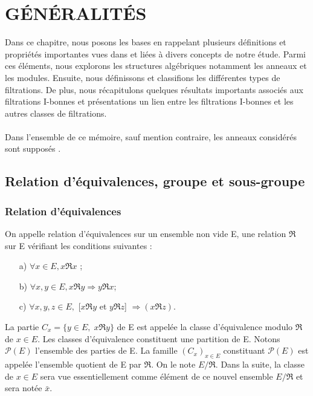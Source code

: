 \chapter{GÉNÉRALITÉS}
Dans ce chapitre, nous posons les bases en rappelant plusieurs définitions et propriétés importantes vues dans \cite{Di2} et liées à divers concepts de notre étude. Parmi ces éléments,
nous explorons les structures algébriques notamment les anneaux et les modules. Ensuite, nous définissons et classifions les différentes types de filtrations. De plus, nous récapitulons quelques résultats importants associés aux filtrations I-bonnes et présentations un lien entre les filtrations I-bonnes et les autres classes de filtrations. \\\\ Dans l'ensemble de ce mémoire, sauf mention contraire, les anneaux considérés sont supposés .
\section{Relation d'équivalences, groupe et sous-groupe}
\subsection{Relation d'équivalences}
\begin{madefinition}
	On appelle relation d’équivalences sur un ensemble non vide E, une relation
	$\Re $ sur E vérifiant les conditions suivantes :
	\begin{enumerate}
		\item[a)] $\forall x \in E, x\Re x$ ;
		\item[b)] $\forall x,y \in E, x\Re y \Longrightarrow y\Re x $;
		\item[c)] $\forall x,y,z \in E,$ [$x\Re y$ et $y\Re z$] $\Longrightarrow (x\Re z)$.
	\end{enumerate}
	La partie $C_x = \{y \in E,\; x\Re y\}  $ de E est appelée la classe d’équivalence modulo $\Re $ de $x \in E$. Les	classes d’équivalence constituent une partition de E. Notons $\mathcal{P}(E)$ l’ensemble des parties de E. La famille $(C_x)_{x \in E}$ constituant $\mathcal{P}(E)$ est appelée l’ensemble quotient de E par $\Re$. On le note $E/\Re $. 
	Dans la suite, la classe de $x \in E$ sera vue essentiellement comme élément de ce nouvel ensemble $E/\Re $ et sera notée $\bar{x}$.
\end{madefinition}
\newpage
